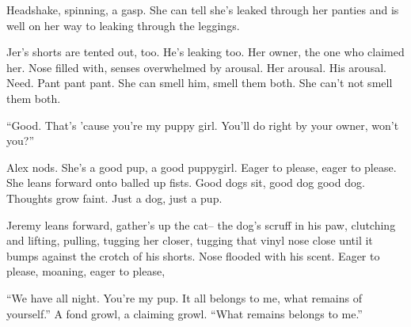 \documentclass[12pt,letterpaper,oneside]{memoir}
\begin{document}
  Headshake, spinning, a gasp. She can tell she's leaked through her
  panties and is well on her way to leaking through the leggings.

  Jer's shorts are tented out, too. He's leaking too. Her owner, the one
  who claimed her. Nose filled with, senses overwhelmed by arousal. Her
  arousal. His arousal. Need. Pant pant pant. She can smell him, smell
  them both. She can't not smell them both.

  ``Good. That's 'cause you're my puppy girl. You'll do right by your
  owner, won't you?''

  Alex nods. She's a good pup, a good puppygirl. Eager to please, eager to
  please. She leans forward onto balled up fists. Good dogs sit, good dog
  good dog. Thoughts grow faint. Just a dog, just a pup.

  Jeremy leans forward, gather's up the cat-- the dog's scruff in his paw,
  clutching and lifting, pulling, tugging her closer, tugging that vinyl
  nose close until it bumps against the crotch of his shorts. Nose flooded
  with his scent. Eager to please, moaning, eager to please,

  ``We have all night. You're my pup. It all belongs to me, what remains
  of yourself.'' A fond growl, a claiming growl. ``What remains belongs to
  me.''
\end{document}
